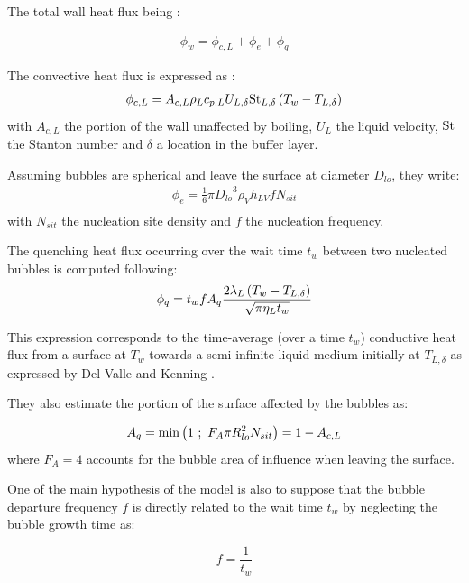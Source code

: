 The total wall heat flux being :

\begin{align}
\phi_{w}=\phi_{c,L}+\phi_{e}+\phi_{q}
\end{align}

The convective heat flux is expressed as :
\begin{align}
\phi_{c,L}=A_{c,L} \rho_{L} c_{p,L}U_{L,\delta} \mathrm{St}_{L,\delta}\left( T_{w}-T_{L,\delta} \right)
\label{eq:KP_hfp_phicL}
\end{align}
with $A_{c,L}$ the portion of the wall unaffected by boiling, $U_{L}$ the liquid velocity, $\mathrm{St}$ the Stanton number and $\delta$ a location in the buffer layer.

\npar
Assuming bubbles are spherical and leave the surface at diameter $D_{lo}$, they write:
\begin{align}
\phi_{e}=\frac{1}{6}\pi {D_{lo}}^{3}\rho_{V}h_{LV}fN_{sit}\\
\label{eq:KP_hfp_phie}
\end{align}
with $N_{sit}$ the nucleation site density and $f$ the nucleation frequency.

\npar
The quenching heat flux occurring over the wait time $t_{w}$ between two nucleated bubbles is computed following:  
\begin{align}
\phi_{q}=t_{w}fA_{q}\frac{2\lambda_{L}\left( T_{w}-T_{L,\delta} \right)}{\sqrt{\pi \eta_{L} t_{w}}}
\label{eq:KP_hfp_phiq}
\end{align}

This expression corresponds to the time-average (over a time $t_{w}$) conductive heat flux from a surface at $T_{w}$ towards a semi-infinite liquid medium initially at $T_{L,\delta}$ as expressed by Del Valle and Kenning \cite{del_valle_subcooled_1985}.

\npar
They also estimate the portion of the surface affected by the bubbles as:

\begin{align}
A_{q}=\mathrm{min}\left( 1\ ;\ F_{A}\pi R_{lo}^{2} N_{sit} \right)=1-A_{c,L}
\label{eq:KP_hfp_Aq}
\end{align}
where $F_{A}=4$ accounts for the bubble area of influence when leaving the surface.

\npar

One of the main hypothesis of the model is also to suppose that the bubble departure frequency $f$ is directly related to the wait time $t_{w}$ by neglecting the bubble growth time as:

\begin{equation}
f = \frac{1}{t_{w}}
\end{equation}

